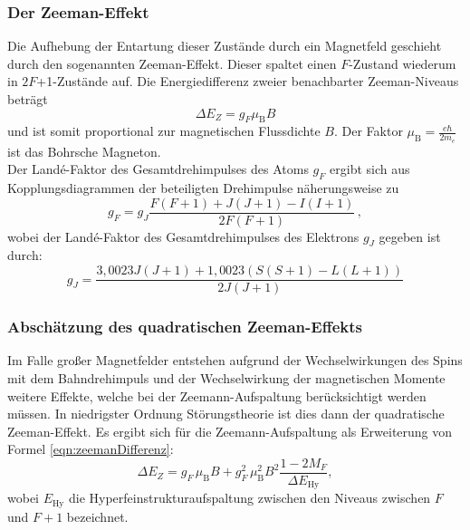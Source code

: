 \subsubsection{Der Zeeman-Effekt}
Die Aufhebung der Entartung dieser Zustände durch ein Magnetfeld geschieht durch den sogenannten Zeeman-Effekt. Dieser spaltet einen $F$-Zustand wiederum in $2F$+1-Zustände auf. Die Energiedifferenz zweier benachbarter Zeeman-Niveaus beträgt
\begin{equation}
\Delta E_Z = g_F \mu_{\text{B}} B
\label{eqn:zeemanDifferenz}
\end{equation}
und ist somit proportional zur magnetischen Flussdichte $B$. Der Faktor $\mu_{\text{B}} = \frac{e \hbar}{2m_e}$ ist das Bohrsche Magneton.\\
Der Landé-Faktor des Gesamtdrehimpulses des Atoms $g_F$ ergibt sich aus Kopplungsdiagrammen der beteiligten Drehimpulse näherungsweise zu
\begin{equation}
g_F = g_J \frac{F(F+1)+J(J+1)-I(I+1)}{2F(F+1)}\,,
\end{equation}
wobei der Landé-Faktor des Gesamtdrehimpulses des Elektrons $g_J$ gegeben ist durch:
\begin{equation}
g_J = \frac{3{,}0023J(J+1)+1{,}0023(S(S+1)-L(L+1))}{2J(J+1)}
\label{eqn:g_J_Theorie}
\end{equation}

\subsubsection{Abschätzung des quadratischen Zeeman-Effekts}
\label{subsec:quadratischerZeeman}

Im Falle großer Magnetfelder entstehen aufgrund der Wechselwirkungen des Spins mit dem Bahndrehimpuls und der Wechselwirkung der magnetischen Momente weitere Effekte, welche bei der Zeemann-Aufspaltung berücksichtigt werden müssen. In niedrigster Ordnung Störungstheorie ist dies dann der quadratische Zeeman-Effekt.
Es ergibt sich für die Zeemann-Aufspaltung als Erweiterung von Formel \eqref{eqn:zeemanDifferenz}:
\begin{equation}
\Delta E_Z = g_F \, \mu_{\text{B}} B + g_F^2 \, \mu_{\text{B}}^2 B^2 \frac{1-2M_F}{\Delta E_{\text{Hy}}},
\label{eqn:zeemanDifferenzQuadratisch}
\end{equation}
wobei $E_\text{Hy}$ die Hyperfeinstrukturaufspaltung zwischen den Niveaus zwischen $F$ und $F+1$ bezeichnet.


